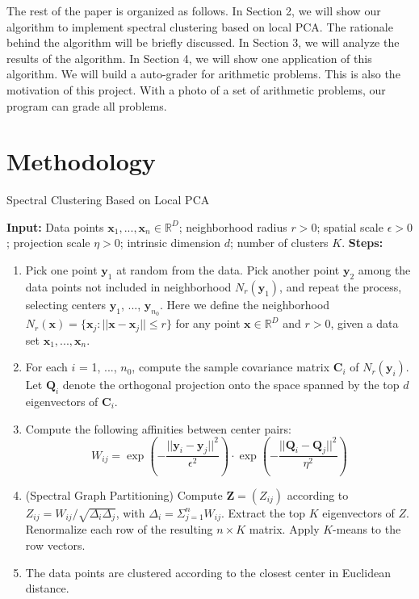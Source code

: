 \documentclass[11pt, oneside]{article}   	%
\begin{document}
The rest of the paper is organized as follows. In Section 2, we will show our algorithm to implement spectral clustering based on local PCA.  The rationale behind the algorithm will be briefly discussed. In Section 3, we will analyze the results of the algorithm. In Section 4, we will show one application of this algorithm. We will build a auto-grader for arithmetic problems. This is also the motivation of this project. With a photo of a set of arithmetic problems, our program can grade all problems.  

\section{Methodology}
\makeatletter
\renewcommand{\thealgorithm}{} %
\makeatother
\begin{algorithm}
\caption{Spectral Clustering Based on Local PCA}
\vspace{0.1in}
\textbf{Input:} \newline
Data points $\boldsymbol{x}_1, ..., \boldsymbol{x}_n \in \mathbb{R}^D$; neighborhood radius $r>0$; spatial scale $\epsilon>0$; projection scale $\eta>0$; intrinsic dimension $d$; number of clusters $K$. \vspace{0.1in} \newline
\textbf{Steps:}
\begin{enumerate}
\item Pick one point $\boldsymbol{y}_1$ at random from the data. Pick another point $\boldsymbol{y}_2$ among the data points not included in neighborhood $N_r(\boldsymbol{y}_1)$, and repeat the process, selecting centers $\boldsymbol{y}_1$, ..., $\boldsymbol{y}_{n_0}$. Here we define the neighborhood $N_r(\boldsymbol{x})=\{\boldsymbol{x}_j : ||\boldsymbol{x}-\boldsymbol{x}_j|| \leqslant r\}$ for any point $\boldsymbol{x} \in \mathbb{R}^D$ and $r>0$, given a data set $\boldsymbol{x}_1, ..., \boldsymbol{x}_n$.
\item For each $i$ = 1, ..., $n_0$, compute the sample covariance matrix $\boldsymbol{C}_i$ of $N_r(\boldsymbol{y}_i)$. Let $\boldsymbol{Q}_i$ denote the orthogonal projection onto the space spanned by the top $d$ eigenvectors of $\boldsymbol{C}_i$.
\item Compute the following affinities between center pairs:
\begin{equation}
W_{ij}=\exp \left( -\frac{||\boldsymbol{y}_i-\boldsymbol{y}_j||^2}{\epsilon^2} \right) \cdot \exp \left(-\frac{||\boldsymbol{Q}_i-\boldsymbol{Q}_j||^2}{\eta^2} \right)
\end{equation}
\item (Spectral Graph Partitioning) Compute $\boldsymbol{Z} = (Z_{ij})$ according to $Z_{ij} = W_{ij}/\sqrt{\Delta_i \Delta_j}$, with $\Delta_i=\Sigma_{j=1}^{n} W_{ij}$. Extract the top $K$ eigenvectors of $Z$. Renormalize each row of the resulting $n \times K$ matrix. Apply $K$-means to the row vectors.
\item The data points are clustered according to the closest center in Euclidean distance.
\end{enumerate}
\end{algorithm}



\end{document}

